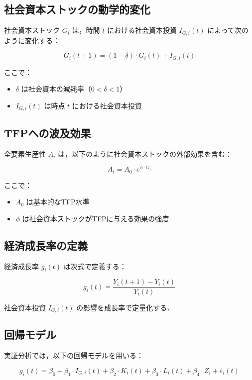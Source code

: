 \subsection{社会資本ストックの動学的変化}

社会資本ストック \( G_i \) は，時間 \( t \) における社会資本投資 \( I_{G,i}(t) \) によって次のように変化する：

\[
	G_i(t+1) = (1-\delta) \cdot G_i(t) + I_{G,i}(t)
\]

ここで：
\begin{itemize}
	\renewcommand{\labelitemi}{}
	\item \( \delta \) は社会資本の減耗率（\( 0 < \delta < 1 \)）
	\item \( I_{G,i}(t) \) は時点 \( t \) における社会資本投資
\end{itemize}

\subsection{TFPへの波及効果}

全要素生産性 \( A_i \) は，以下のように社会資本ストックの外部効果を含む：

\[
	A_i = A_0 \cdot e^{\phi \cdot G_i}
\]

ここで：
\begin{itemize}
	\renewcommand{\labelitemi}{}
	\item \( A_0 \) は基本的なTFP水準
	\item \( \phi \) は社会資本ストックがTFPに与える効果の強度
\end{itemize}

\subsection{経済成長率の定義}

経済成長率 \( g_i(t) \) は次式で定義する：

\[
	g_i(t) = \frac{Y_i(t+1) - Y_i(t)}{Y_i(t)}
\]

社会資本投資 \( I_{G,i}(t) \) の影響を成長率で定量化する．

\subsection{回帰モデル}

実証分析では，以下の回帰モデルを用いる：

\[
	g_i(t) = \beta_0 + \beta_1 \cdot I_{G,i}(t) + \beta_2 \cdot K_i(t) + \beta_3 \cdot L_i(t) + \beta_4 \cdot Z_i + \varepsilon_i(t)
\]

